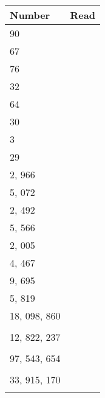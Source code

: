 \documentclass[24pt]{article}
\begin{document}
    {
    \Large
    \begin{tabular}{ l|p{15cm} }
    
    \toprule
    Number & Read \\
    \midrule
    90 & \hfill \\
\midrule
67 & \hfill \\
\midrule
76 & \hfill \\
\midrule
32 & \hfill \\
\midrule
64 & \hfill \\
\midrule
30 & \hfill \\
\midrule
3 & \hfill \\
\midrule
29 & \hfill \\
\midrule
2, 966 & \hfill \\
\midrule
5, 072 & \hfill \\
\midrule
2, 492 & \hfill \\
\midrule
5, 566 & \hfill \\
\midrule
2, 005 & \hfill \\
\midrule
4, 467 & \hfill \\
\midrule
9, 695 & \hfill \\
\midrule
5, 819 & \hfill \\
\midrule
18, 098, 860 & \hfill \\
 & \\
\midrule
12, 822, 237 & \hfill \\
 & \\
\midrule
97, 543, 654 & \hfill \\
 & \\
\midrule
33, 915, 170 & \hfill \\
 & \\
    \bottomrule
    
    \end{tabular}
    }
    \newpage
\end{document}
